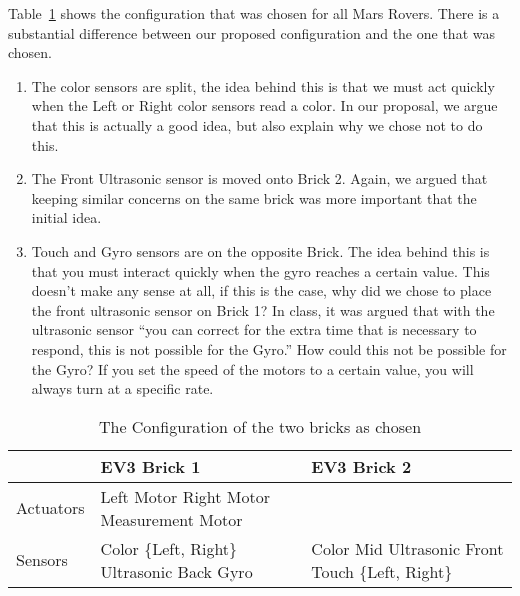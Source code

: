 \documentclass{scrartcl}
\begin{document}
Table~\ref{tab:config_c} shows the configuration that was chosen for all Mars Rovers.
There is a substantial difference between our proposed configuration and the one that was chosen.
\begin{enumerate}
	\item The color sensors are split, the idea behind this is that we must act quickly when the Left or Right color sensors read a color.
		In our proposal, we argue that this is actually a good idea, but also explain why we chose not to do this.
	\item The Front Ultrasonic sensor is moved onto Brick 2.
		Again, we argued that keeping similar concerns on the same brick was more important that the initial idea.
	\item Touch and Gyro sensors are on the opposite Brick.
		The idea behind this is that you must interact quickly when the gyro reaches a certain value.
		This doesn't make any sense at all, if this is the case, why did we chose to place the front ultrasonic sensor on Brick 1?
		In class, it was argued that with the ultrasonic sensor ``you can correct for the extra time that is necessary to respond, this is not possible for the Gyro.''
		How could this not be possible for the Gyro?
		If you set the speed of the motors to a certain value, you will always turn at a specific rate.
\end{enumerate}
\begin{table}
	\centering
	\begin{tabular}{|l|p{5cm}|p{5cm}|}
		\hline
		& EV3 Brick 1 & EV3 Brick 2 \\\hline
		Actuators & Left Motor \newline Right Motor \newline Measurement Motor & \\\hline
		Sensors & Color \{Left, Right\} \newline Ultrasonic Back \newline Gyro & Color Mid \newline Ultrasonic Front \newline Touch \{Left, Right\} \\\hline
	\end{tabular}
	\caption{The Configuration of the two bricks as chosen}
	\label{tab:config_c}
\end{table}
\end{document}
